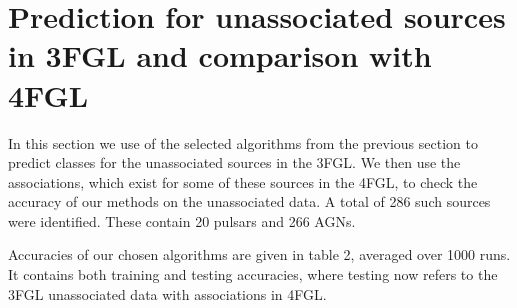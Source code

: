 \section{Prediction for unassociated sources in 3FGL and comparison with 4FGL}


In this section we use of the selected algorithms from the previous section to predict classes for the unassociated sources in the 3FGL. 
We then use the associations, which exist for some of these sources in the 4FGL, to check the accuracy of our methods on the unassociated data.  A total of 286 such sources were identified. These contain 20 pulsars and 266 AGNs.


Accuracies of our chosen algorithms are given in table 2, averaged over 1000 runs. It contains both training and testing accuracies, where testing now refers to the 3FGL unassociated data with associations in 4FGL. 


\begin{table}[!h]

    \vspace{0.2cm}
    \caption{Accuracy of the 4 selected algorithms on 3FGL unassociated data.}
    \label{tab:selected_algs}
\end{table}

